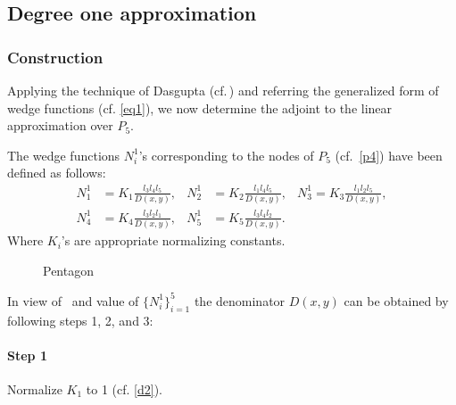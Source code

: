 \documentclass[automatic-bibliography]{univsciauth}
\begin{document}
\subsection{Degree one approximation}

\subsubsection{Construction}

Applying the technique of Dasgupta (cf.\,\cite{das}) and referring the
generalized form of wedge functions (cf. \autoref{eq1}), we now determine the
adjoint to the linear approximation over $P_5$.

The wedge functions $N_i^1$\rq{}s corresponding to the nodes of $P_5$
(cf.~\autoref{p4}) have been defined as follows:
\begin{equation}
  \begin{aligned}\label{d2}
    N_1^1&=K_1\frac{l_{3}l_{4}l_{5}}{D(x,y)},
    &N_2^1&=K_2\frac{l_{1}l_{4}l_{5}}{D(x,y)},
    &N_3^1=K_3\frac{l_{1}l_{2}l_{5}}{D(x,y)},\\
    N_4^1&=K_4\frac{l_{3}l_{2}l_{1}}{D(x,y)},
    &N_5^1&=K_5\frac{l_{3}l_{4}l_{2}}{D(x,y)}.
  \end{aligned}
\end{equation}
Where $K_i$'s are appropriate normalizing constants.
\begin{figure}[t!]
  \centering
  \caption{Pentagon}\label{p4}
\end{figure}

In view of~\cite{das} and value of $\{N_i^1\}_{i=1}^5$ the denominator $D(x,y)$
can be obtained by following steps 1, 2, and 3:
\paragraph{\textbf{Step 1}} Normalize $K_1$ to 1 (cf. \autoref{d2}).
\end{document}
